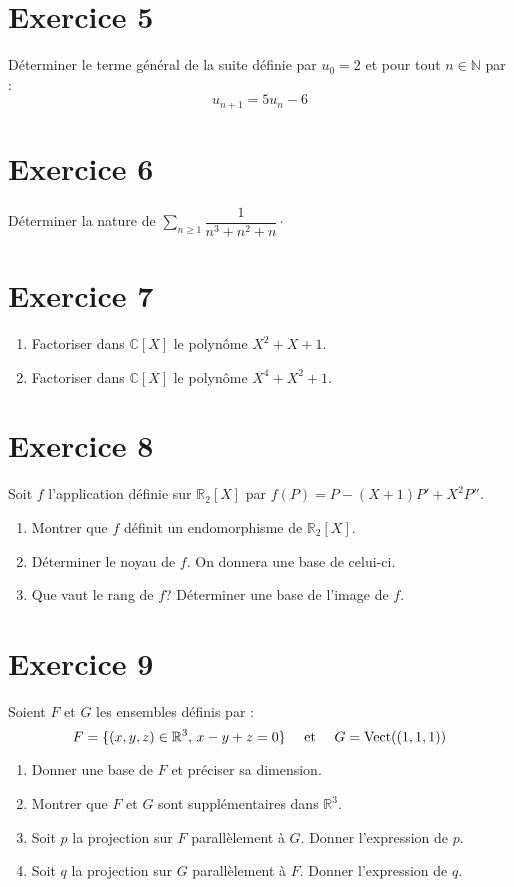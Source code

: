 \documentclass[twoside,french,11pt]{VcCours}
\begin{document}
\medskip
\section*{Exercice 5}
Déterminer le terme général de la suite définie par $u_0=2$ et pour tout $n \in \mathbb{N}$ par :
$$u_{n+1} = 5 u_n -6$$

\medskip
\section*{Exercice 6}
Déterminer la nature de $\sum_{n \geq 1} \dfrac{1}{n^3+n^2+n} \cdot$

\medskip
\section*{Exercice 7}
 

\begin{enumerate}
\item Factoriser dans $\mathbb{C}[X]$ le polynôme $X^2+X+1$.
\item Factoriser dans $\mathbb{C}[X]$ le polynôme $X^4+X^2+1$.
\end{enumerate}

\medskip
 \section*{Exercice 8}
Soit $f$ l'application définie sur $\mathbb{R}_2[X]$ par $f(P)=P-(X+1)P'+X^2 P''$.
\begin{enumerate}
\item Montrer que $f$ définit un endomorphisme de $\mathbb{R}_2[X]$.
\item Déterminer le noyau de $f$. On donnera une base de celui-ci.
\item Que vaut le rang de $f$? Déterminer une base de l'image de $f$.
\end{enumerate}

\medskip
\section*{Exercice 9}
Soient $F$ et $G$ les ensembles définis par :
$$ F = \lbrace (x,y,z) \in \mathbb{R}^3, \, x-y+z=0 \rbrace \quad \hbox{ et }  \quad G = \textrm{Vect}((1,1,1)) $$

\begin{enumerate}
\item Donner une base de $F$ et préciser sa dimension.
\item Montrer que $F$ et $G$ sont supplémentaires dans $\mathbb{R}^3$.
\item Soit $p$ la projection sur $F$ parallèlement à $G$. Donner l'expression de $p$.
\item Soit $q$ la projection sur $G$ parallèlement à $F$. Donner l'expression de $q$.
\end{enumerate}
\end{document}
